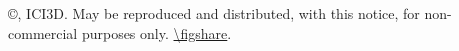 \copyright \years, ICI3D.  May be reproduced and distributed, with this notice, for non-commercial purposes only. \url{\figshare}.
